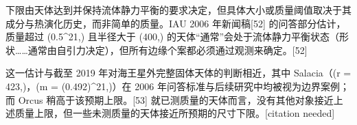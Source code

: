 下限由天体达到并保持流体静力平衡的要求决定，但具体大小或质量阈值取决于其成分与热演化历史，而非简单的质量。IAU 2006 年新闻稿[52] 的问答部分估计，质量超过 (0.5^{21},) 且半径大于 (400,) 的天体“通常”会处于流体静力平衡状态（形状……通常由自引力决定），但所有边缘个案都必须通过观测来确定。[52]

这一估计与截至 2019 年对海王星外完整固体天体的判断相近，其中 Salacia（(r = 423,)，(m = (0.492)^{21},)）在 2006 年问答标准与后续研究中均被视为边界案例；而 Orcus 稍高于该预期上限。[53] 就已测质量的天体而言，没有其他对象接近上述质量上限，但一些未测质量的天体接近所预期的尺寸下限。[citation needed]
